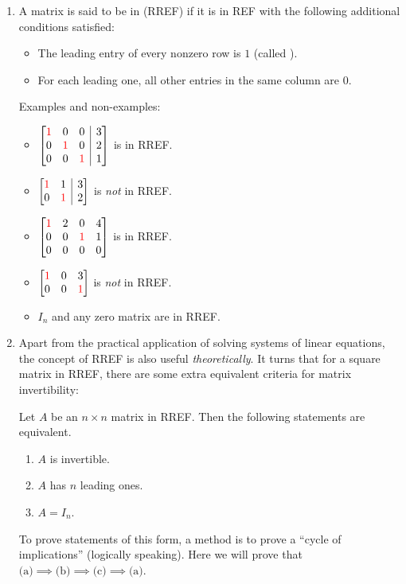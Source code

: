 \begin{enumerate}
\item A matrix is said to be in  (RREF) if it is
in REF with the following additional conditions satisfied:
\begin{itemize}
\item The leading entry of every nonzero row is \(1\) (called ).
\item For each leading one, all other entries in the same column are \(0\).
\end{itemize}
Examples and non-examples:
\begin{itemize}
\item \(
\left[\begin{array}{@{}ccc|c@{}}
\rc{1}&0&0&3\\
0&\rc{1}&0&2\\
0&0&\rc{1}&1\\
\end{array}\right]
\) is in RREF.

\item \(
\left[\begin{array}{@{}cc|c@{}}
\rc{1}&1&3\\
0&\rc{1}&2
\end{array}\right]
\) is \emph{not} in RREF.

\item \(\mqty[\rc{1}&2&0&4\\ 0&0&\rc{1}&1\\ 0&0&0&0]\) is in RREF.
\item \(\mqty[\rc{1}&0&3\\ 0&0&\rc{1}]\) is \emph{not} in RREF.

\item \(I_n\) and any zero matrix are in RREF.
\end{itemize}

\item Apart from the practical application of solving systems of linear
equations, the concept of RREF is also useful \emph{theoretically}. It turns
that for a square matrix in RREF, there are some extra equivalent criteria for
matrix invertibility:
\begin{theorem}
\label{thm:rref-matx-inv-equiv}
Let \(A\) be an \(n\times n\) matrix in RREF. Then the following statements are
equivalent.
\begin{enumerate}
\item \(A\) is invertible.
\item \(A\) has \(n\) leading ones.
\item \(A=I_n\).
\end{enumerate}
\end{theorem}
\begin{pf}
To prove statements of this form, a method is to prove a ``cycle of
implications'' (logically speaking). Here we will prove that
\(\text{(a)}\implies \text{(b)}\implies \text{(c)}\implies \text{(a)}\).


\end{pf}
\end{enumerate}
